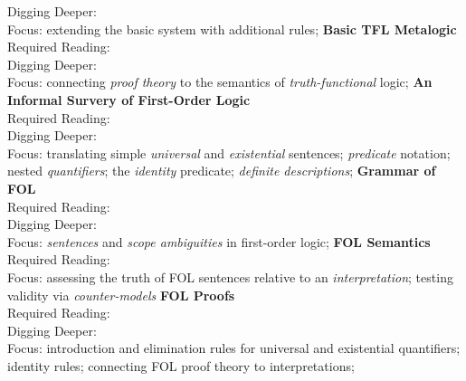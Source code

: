\begin{outline}[enumerate]
Digging Deeper: \cite[Chapter 23 (pp. 211-215)]{Smi20} \\
Focus:
extending the basic system with additional rules;
\1 \textbf{Basic TFL Metalogic}
\\ Required Reading: \cite[Chapter 22 (pp. 182-188)]{Mag25} \\
Digging Deeper: \cite[Chapter 24 (pp. 216-228)]{Smi20} \\
Focus:
connecting \emph{proof theory} to the semantics of \emph{truth-functional}
logic;
\1 \textbf{An Informal Survery of First-Order Logic}
\\ Required Reading: \cite[Chapter 23-27 (pp. 190-242)]{Mag25} \\
Digging Deeper: \cite[Chapters 25-27,31 (pp. 228-258,293-298)]{Smi20} \\
Focus:
translating simple \emph{universal} and \emph{existential} sentences;
\emph{predicate} notation; nested \emph{quantifiers}; the \emph{identity}
predicate; \emph{definite descriptions};
\1 \textbf{Grammar of FOL}
\\ Required Reading: \cite[Chapter 28-29 (pp. 243-256)]{Mag25} \\
Digging Deeper: \cite[Chapters 28-30 (pp. 258-289)]{Smi20} \\
Focus:
\emph{sentences} and \emph{scope ambiguities} in first-order logic;
\1 \textbf{FOL Semantics}
\\ Required Reading: \cite[Chapter 30-35 (pp. 258-295)]{Mag25} \\
Focus:
assessing the truth of FOL sentences relative to an \emph{interpretation};
testing validity via \emph{counter-models}
\1 \textbf{FOL Proofs}
\\ Required Reading: \cite[Chapters 36-41 (pp. 297-335)]{Mag25} \\
Digging Deeper: \cite[Chapters 32-42, Appendix (pp. 299-412)]{Smi20} \\
Focus:
introduction and elimination rules for universal and existential quantifiers;
identity rules; connecting FOL proof theory to interpretations;

\end{outline}
